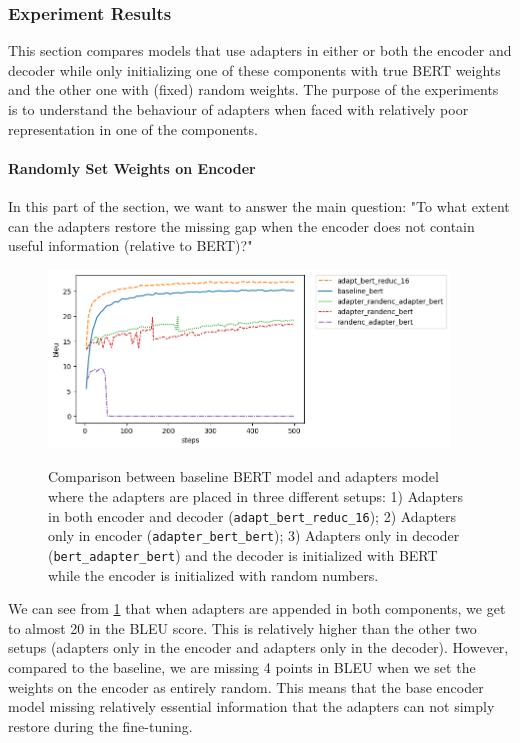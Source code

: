 \subsubsection{Experiment Results}
This section compares models that use adapters in either or both the encoder and decoder while only initializing one of these components with true BERT weights and the other one with (fixed) random weights. The purpose of the experiments is to understand the behaviour of adapters when faced with relatively poor representation in one of the components.

\paragraph{Randomly Set Weights on Encoder}
In this part of the section, we want to answer the main question: "To what extent can the adapters restore the missing gap when the encoder does not contain useful information (relative to BERT)?"

\begin{figure}[h]
    {\includegraphics[width=0.95\textwidth]{img/adapter_bert_randenc.png}}
    \centering
    \caption{Comparison between baseline BERT model and adapters model where the adapters are placed in three different setups: 1) Adapters in both encoder and decoder (\texttt{adapt\_bert\_reduc\_16}); 2) Adapters only in encoder (\texttt{adapter\_bert\_bert}); 3) Adapters only in decoder (\texttt{bert\_adapter\_bert}) and the decoder is initialized with BERT while the encoder is initialized with random numbers.}
    \label{img:adapt_bert_randenc}
\end{figure}

We can see from \cref{img:adapt_bert_randenc} that when adapters are appended in both components, we get to almost 20 in the BLEU score. This is relatively higher than the other two setups (adapters only in the encoder and adapters only in the decoder). However, compared to the baseline, we are missing 4 points in BLEU when we set the weights on the encoder as entirely random. This means that the base encoder model missing relatively essential information that the adapters can not simply restore during the fine-tuning.

